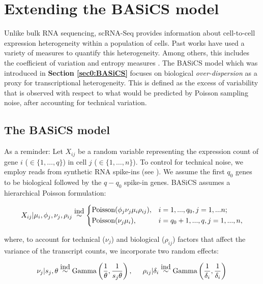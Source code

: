
\section{Extending the  BASiCS model}

Unlike bulk RNA sequencing, scRNA-Seq provides information about cell-to-cell expression heterogeneity within a population of cells. Past works have used a variety of measures to quantify this heterogeneity. Among others, this includes the coefficient of variation \citep[CV,][]{Brennecke2013} and entropy measures \citep{Richard2016}. The BASiCS model \citep{Vallejos2015BASiCS, Vallejos2016} which was introduced in \textbf{Section \ref{sec0:BASiCS}} focuses on biological \textit{over-dispersion} as a proxy for transcriptional heterogeneity. This is defined as the excess of variability that is observed with respect to what would be predicted by Poisson sampling noise, after accounting for technical variation. 

\subsection{The BASiCS model}

As a reminder: Let $X_{ij}$ be a random variable representing the expression count of gene $i$ ($ \in \{1, \ldots, q\}$) in cell $j$ ($\in \{ 1, \ldots ,n\}$).  To control for technical noise, we employ reads from synthetic RNA spike-ins (see \citep{Jiang2011}). We assume the first $q_0$ genes to be biological followed by the $q-q_0$ spike-in genes. BASiCS assumes a hierarchical Poisson formulation: 

\begin{equation} \label{eq::PoissonBASiCS}
 X_{ij}|\mu_i,\phi_j,\nu_j,\rho_{ij} \stackrel{\mbox{ind}}{\sim}
 \left\lbrace
  \begin{aligned}
    &\text{Poisson}(\phi_j\nu_j\mu_i\rho_{ij}), && i=1,...,q_0,j=1,...n;  \\ 
    &\text{Poisson}(\nu_j\mu_i), && i=q_0+1,...,q,j=1,...,n,    	    
  \end{aligned}
\right.
\end{equation} 

where, to account for technical ($\nu_j$) and biological ($\rho_{ij}$) factors that affect the variance of the transcript counts, we incorporate two random effects: 

\begin{equation} \label{eq::RandomEffectsBASiCS}
\nu_j|s_j,\theta \stackrel{\mbox{ind}}{\sim} \text{Gamma}\left(\frac{1}{\theta},\frac{1}{s_j\theta}\right), \hspace{0.5cm} \rho_{ij}|\delta_i  \stackrel{\mbox{ind}}{\sim} \text{Gamma}\left(\frac{1}{\delta_i},\frac{1}{\delta_i}\right)\\
\end{equation} 

